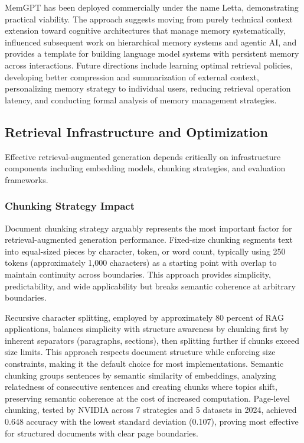MemGPT has been deployed commercially under the name Letta, demonstrating practical viability. The approach suggests moving from purely technical context extension toward cognitive architectures that manage memory systematically, influenced subsequent work on hierarchical memory systems and agentic AI, and provides a template for building language model systems with persistent memory across interactions. Future directions include learning optimal retrieval policies, developing better compression and summarization of external context, personalizing memory strategy to individual users, reducing retrieval operation latency, and conducting formal analysis of memory management strategies.

\subsection{Retrieval Infrastructure and Optimization}

Effective retrieval-augmented generation depends critically on infrastructure components including embedding models, chunking strategies, and evaluation frameworks.

\subsubsection{Chunking Strategy Impact}

Document chunking strategy arguably represents the most important factor for retrieval-augmented generation performance. Fixed-size chunking segments text into equal-sized pieces by character, token, or word count, typically using 250 tokens (approximately 1,000 characters) as a starting point with overlap to maintain continuity across boundaries. This approach provides simplicity, predictability, and wide applicability but breaks semantic coherence at arbitrary boundaries.

Recursive character splitting, employed by approximately 80 percent of RAG applications, balances simplicity with structure awareness by chunking first by inherent separators (paragraphs, sections), then splitting further if chunks exceed size limits. This approach respects document structure while enforcing size constraints, making it the default choice for most implementations. Semantic chunking groups sentences by semantic similarity of embeddings, analyzing relatedness of consecutive sentences and creating chunks where topics shift, preserving semantic coherence at the cost of increased computation. Page-level chunking, tested by NVIDIA across 7 strategies and 5 datasets in 2024, achieved 0.648 accuracy with the lowest standard deviation (0.107), proving most effective for structured documents with clear page boundaries.

